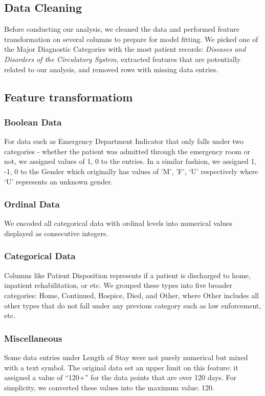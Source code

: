 \documentclass[12pt]{article}
\begin{document}
\subsection{Data Cleaning}
Before conducting our analysis, we cleaned the data and performed feature transformation on several columns to prepare for model fitting. We picked one of the Major Diagnostic Categories with the most patient records: \textit{Diseases and Disorders of the Circulatory System}, extracted features that are potentially related to our analysis, and removed rows with missing data entries. 

\subsection{Feature transformatiom}

\subsubsection{Boolean Data} For data such as Emergency Department Indicator that only falls under two categories - whether the patient was admitted through the emergency room or not, we assigned values of {1, 0} to the entries. In a similar fashion, we assigned {1, -1, 0} to the Gender which originally has values of {’M’, ’F’, ‘U’} respectively where ‘U’ represents an unknown gender.

\subsubsection{Ordinal Data} We encoded all categorical data with ordinal levels into numerical values displayed as consecutive integers. 

\subsubsection{Categorical Data} Columns like Patient Disposition represents if a patient is discharged to home, inpatient rehabilitation, or etc. We grouped these types into five broader categories: Home, Continued, Hospice, Died, and Other, where Other includes all other types that do not fall under any previous category such as law enforcement, etc.

\subsubsection{Miscellaneous} Some data entries under Length of Stay were not purely numerical but mixed with a text symbol. The original data set an upper limit on this feature: it assigned a value of “120+” for the data points that are over 120 days. For simplicity, we converted these values into the maximum value: 120.
\end{document}
